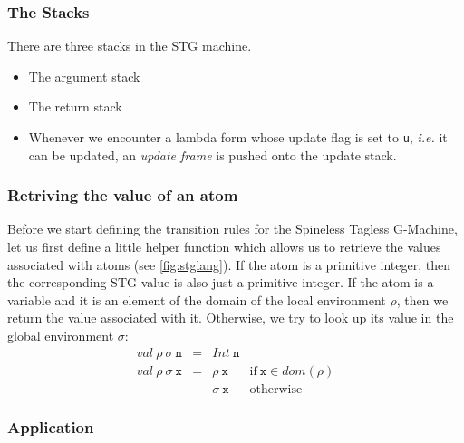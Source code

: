 \documentclass[10pt,a4paper]{exam} %
\begin{document}
\subsubsection{The Stacks}

There are three stacks in the STG machine.

\begin{itemize}
\item The argument stack 
\item The return stack
\item Whenever we encounter a lambda form whose update flag is set to \texttt{u}, \emph{i.e.} it can be updated, an \emph{update frame} is pushed onto the update stack. 
\end{itemize}

\subsubsection{Retriving the value of an atom}

Before we start defining the transition rules for the Spineless Tagless G-Machine, let us first define a little helper function which allows us to retrieve the values associated with atoms (see \autoref{fig:stglang}). If the atom is a primitive integer, then the corresponding STG value is also just a primitive integer. If the atom is a variable and it is an element of the domain of the local environment $\rho$, then we return the value associated with it. Otherwise, we try to look up its value in the global environment $\sigma$:
\begin{displaymath}
\begin{array}{lcll}
\mathit{val}~\rho~\sigma~\texttt{n} & = & \mathit{Int}~\texttt{n} & \\
\mathit{val}~\rho~\sigma~\texttt{x} & = & \rho~\texttt{x}   & \text{if}~\texttt{x} \in \mathit{dom}(\rho) \\
                                    &   & \sigma~\texttt{x} & \text{otherwise}
\end{array}
\end{displaymath}

\subsubsection{Application}
\end{document}
